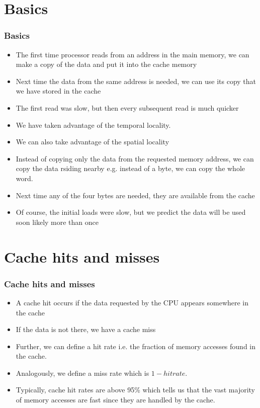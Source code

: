 \documentclass{beamer}
\begin{document}
\section{Basics}
\begin{frame}
\frametitle{Basics}
\begin{itemize}
\item The first time processor reads from an address in the main memory, we can make a copy of the data and put it into the cache memory
\item Next time the data from the same address is needed, we can use its copy that we have stored in the cache
\item The first read was slow, but then every subsequent read is much quicker
\item We have taken advantage of the {\color{red}temporal} locality.
\item We can also take advantage of the {\color{green} spatial} locality
\item Instead of copying only the data from the requested memory address, we can copy the data rsiding nearby e.g. instead of a byte, we can copy the whole word.
\item Next time any of the four bytes are needed, they are available from the cache
\item Of course, the initial loads were slow, but we predict the data will be used soon likely more than once
\end{itemize}
\end{frame}
\section{Cache hits and misses}
\begin{frame}
\frametitle{Cache hits and misses}
\begin{itemize}
\item A {\color{red}cache hit} occurs if the data requested by the CPU appears somewhere in the cache
\item If the data is not there, we have a {\color{green}cache miss}
\item Further, we can define a {\color{purple}hit rate} i.e. the fraction of memory accesses found in the cache.
\item Analogously, we define a {\color{orange}miss rate} which is $1-hit rate$.
\item Typically, cache hit rates are above 95\% which tells us that the vast majority of memory accesses are fast since they are handled by the cache.
\end{itemize}
\end{frame}
\end{document}
